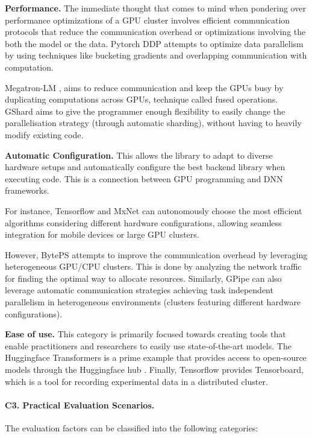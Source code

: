 \textbf{Performance.}
The immediate thought that comes to mind when pondering over performance optimizations of a GPU cluster involves
efficient communication protocols that reduce the communication overhead or optimizations involving the
both the model or the data. Pytorch DDP \cite{li_pytorch_2020} attempts to optimize data parallelism by
using techniques like bucketing gradients and overlapping communication with computation.

Megatron-LM \cite{shoeybi_megatron-lm_2020}, aims to reduce communication and keep the GPUs busy by
duplicating computations across GPUs, technique called fused operations. GShard
\cite{lepikhin_gshard_2020} aims to give the programmer enough flexibility to easily change the
parallelisation strategy (through automatic sharding), without having to heavily modify existing
code.

\textbf{Automatic Configuration.}
This allows the library to adapt to diverse hardware setups and automatically configure the best
backend library when executing code. This is a connection between GPU programming and DNN frameworks.

For instance, Tensorflow \cite{abadi_tensorflow_2016} and MxNet \cite{chen_mxnet_2015} can
autonomously choose the most efficient algorithms considering different hardware configurations,
allowing seamless integration for mobile devices or large GPU clusters.

However, BytePS \cite{jiang_unified_nodate} attempts to improve the communication overhead by
leveraging heterogeneous GPU/CPU clusters. This is done by analyzing the network traffic for
finding the optimal way to allocate resources. Similarly, GPipe \cite{huang_gpipe_2019} can also
leverage automatic communication strategies achieving task independent parallelism in heterogeneous
environments (clusters featuring different hardware configurations).

\textbf{Ease of use.}
This category is primarily focused towards creating tools that enable practitioners and researchers to easily
use state-of-the-art models. The Huggingface Transformers \cite{wolf_huggingfaces_2020} is a prime example
that provides access to open-source models through the Huggingface hub \cite{noauthor_hugging_2025}.
Finally, Tensorflow \cite{abadi_tensorflow_2016} provides Tensorboard, which is a tool for recording
experimental data in a distributed cluster.

\paragraph{C3. Practical Evaluation Scenarios.}
The evaluation factors can be classified into the following categories:

